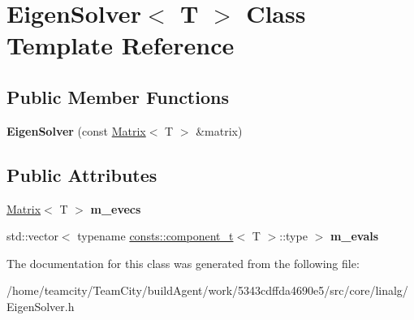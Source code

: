 \hypertarget{classEigenSolver}{}\section{Eigen\+Solver$<$ T $>$ Class Template Reference}
\label{classEigenSolver}
\subsection*{Public Member Functions}
\begin{DoxyCompactItemize}
\item 
{\bfseries Eigen\+Solver} (const \hyperlink{classMatrix}{Matrix}$<$ T $>$ \&matrix)\hypertarget{classEigenSolver_af4c7de6d265f452e879a0cb002e85657}{}\label{classEigenSolver_af4c7de6d265f452e879a0cb002e85657}

\end{DoxyCompactItemize}
\subsection*{Public Attributes}
\begin{DoxyCompactItemize}
\item 
\hyperlink{classMatrix}{Matrix}$<$ T $>$ {\bfseries m\+\_\+evecs}\hypertarget{classEigenSolver_a258d447b545146a35ebafcdef9666249}{}\label{classEigenSolver_a258d447b545146a35ebafcdef9666249}

\item 
std\+::vector$<$ typename \hyperlink{structconsts_1_1component__t}{consts\+::component\+\_\+t}$<$ T $>$\+::type $>$ {\bfseries m\+\_\+evals}\hypertarget{classEigenSolver_a99ef6b50732d813bc55cb2195ddc8883}{}\label{classEigenSolver_a99ef6b50732d813bc55cb2195ddc8883}

\end{DoxyCompactItemize}


The documentation for this class was generated from the following file\+:\begin{DoxyCompactItemize}
\item 
/home/teamcity/\+Team\+City/build\+Agent/work/5343cdffda4690e5/src/core/linalg/Eigen\+Solver.\+h\end{DoxyCompactItemize}
